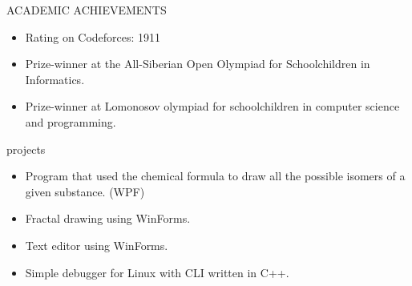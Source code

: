 \documentclass{resume}
\begin{document}
\begin{ResumeSection}{ACADEMIC ACHIEVEMENTS}
    \begin{itemize}
        \item Rating on Codeforces: 1911
        \item Prize-winner at the All-Siberian Open Olympiad for Schoolchildren in Informatics. 
        \item Prize-winner at Lomonosov olympiad for schoolchildren in computer science and programming.
    \end{itemize}
\end{ResumeSection}

\begin{ResumeSection}{projects}
    \begin{itemize}
        \item {
            Program that used the chemical formula to draw all the possible isomers of a given substance. (WPF)
        }
    \end{itemize}
    \begin{itemize}
        \item {
            Fractal drawing using WinForms.
        }
    \end{itemize}
    \begin{itemize}
        \item { 
            Text editor using WinForms.
        }
    \end{itemize}
    \begin{itemize}
        \item {
            Simple debugger for Linux with CLI written in C++.
        }
    \end{itemize}
\end{ResumeSection}
\end{document}
